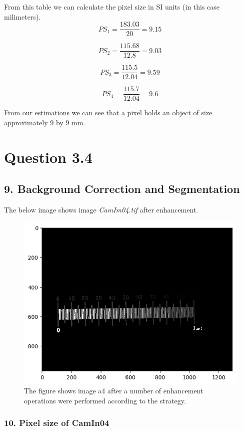 \documentclass{article}
\begin{document}
From this table we can calculate the pixel size in SI units (in this case milimeters). 
\begin{equation}
PS_{1} = \frac{183.03}{20}  = 9.15
\end{equation}

\begin{equation}
PS_{2} = \frac{115.68}{12.8}  = 9.03
\end{equation}

\begin{equation}
PS_{3} = \frac{115.5}{12.04}  = 9.59
\end{equation}

\begin{equation}
PS_{4} = \frac{115.7}{12.04}  = 9.6
\end{equation}

From our estimations we can see that a pixel holds an object of size approximately 9 by 9 mm.
\clearpage
\section*{Question 3.4}
\subsection*{9. Background Correction and Segmentation}
The below image shows image \emph{CamIm04.tif} after enhancement. 
\begin{figure}[h!]
\centering
\includegraphics[width=0.8\linewidth]{Report/Images/a4_background_correction.png}
\caption{\label{fig:enhanced_cam4}The figure shows image {a4} after a number of enhancement operations were performed according to the strategy.}
\end{figure}

\subsubsection*{10. Pixel size of CamIn04}
\end{document}
